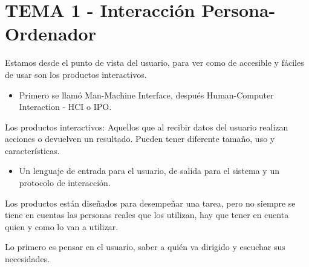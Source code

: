 \documentclass[12pt, twoside, openright]{report} %
\begin{document}
\chapter{TEMA 1 - Interacción Persona-Ordenador}
Estamos desde el punto de vista del usuario, para ver como de
    accesible y fáciles de usar son los productos interactivos.

    \begin{itemize}
    
    \item
      Primero se llamó Man-Machine Interface, después Human-Computer
      Interaction - HCI o IPO.
    \end{itemize}

	Los productos interactivos: Aquellos que al recibir datos del
    usuario realizan acciones o devuelven un resultado. Pueden tener
    diferente tamaño, uso y características.

    \begin{itemize}
    \item
      Un lenguaje de entrada para el usuario, de salida para el sistema
      y un protocolo de interacción.
    \end{itemize}

	Los productos están diseñados para desempeñar una tarea, pero no
    siempre se tiene en cuentas las personas reales que los utilizan,
    hay que tener en cuenta quien y como lo van a utilizar.

	Lo primero es pensar en el usuario, saber a quién va dirigido y
    escuchar sus necesidades.
\end{document}
